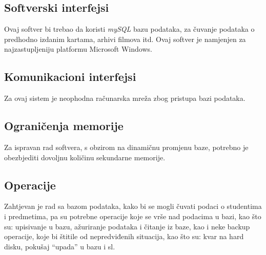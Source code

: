 \subsection{Softverski interfejsi}
Ovaj softver bi trebao da koristi \textit{mySQL} bazu podataka, za čuvanje podataka o predhodno izdanim kartama, arhivi filmova itd. Ovaj softver je namjenjen za najzastupljeniju platformu Microsoft  Windows.

\subsection{Komunikacioni interfejsi} 
Za ovaj sistem je neophodna računarska mreža zbog pristupa bazi podataka.

\subsection{Ograničenja memorije}
Za ispravan rad softvera, s obzirom na dinamičnu promjenu baze, potrebno je obezbjediti dovoljnu količinu sekundarne memorije.

\subsection{Operacije}
Zahtjevan je rad sa bazom podataka, kako bi se
mogli čuvati podaci o studentima i predmetima, pa su potrebne operacije
koje se vrše nad podacima u bazi, kao što su: upisivanje u bazu,
ažuriranje podataka i čitanje iz baze, kao i neke backup operacije, koje bi
štitile od nepredviđenih situacija, kao što su: kvar na hard disku, pokušaj
“upada” u bazu i sl.


